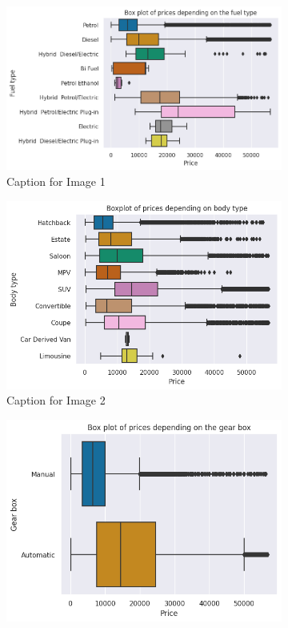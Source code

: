 \documentclass[12pt]{article}
\begin{document}
\FloatBarrier
\begin{figure}[ht]
  \centering
  \begin{subfigure}{0.36\textwidth}
    \includegraphics[width=\linewidth]{fuel type.png}
    \caption{Caption for Image 1}
    \label{fig:image1}
  \end{subfigure}
  \hfill
  \begin{subfigure}{0.32\textwidth}
    \includegraphics[width=\linewidth]{body type.png}
    \caption{Caption for Image 2}
    \label{fig:image2}
  \end{subfigure}
  \hfill
  \begin{subfigure}{0.30\textwidth}
    \includegraphics[width=\linewidth]{gear box.png}

\end{subfigure}
\end{figure}
\end{document}

